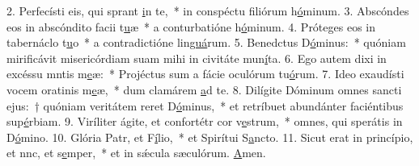 2. Perfecísti eis, qui sprant \uline{i}n te,~* in conspéctu filiórum h\uline{ó}minum.
3. Abscóndes eos in abscóndito facii t\uline{u}æ~* a conturbatióne h\uline{ó}minum.
4. Próteges eos in tabernáclo t\uline{u}o~* a contradictióne lin\uline{guá}rum.
5. Benedctus D\uline{ó}minus:~* quóniam mirificávit misericórdiam suam mihi in civitáte mun\uline{í}ta.
6. Ego autem dixi in excéssu mntis m\uline{e}æ:~* Projéctus sum a fácie oculórum tu\uline{ó}rum.
7. Ideo exaudísti vocem oratinis m\uline{e}æ,~* dum clamárem \uline{a}d te.
8. Dilígite Dóminum omnes sancti ejus:~† quóniam veritátem reret D\uline{ó}minus,~* et retríbuet abundánter faciéntibus sup\uline{é}rbiam.
9. Viríliter ágite, et confortétr cor v\uline{e}strum,~* omnes, qui sperátis in D\uline{ó}mino.
10. Glória Patr, et F\uline{í}lio,~* et Spirítui S\uline{a}ncto.
11. Sicut erat in princípio, et nnc, et s\uline{e}mper,~* et in sǽcula sæculórum. \uline{A}men.
